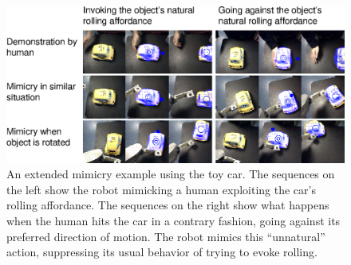 \begin{figure}[tb]
\begin{center}
\includegraphics[width=\textwidth]{fig-mimicry-awkward.eps}
\caption{ 
\label{fig:mimicked-action}
%
An extended mimicry example using the toy car.
The sequences on the left show the robot mimicking a human exploiting
the car's rolling affordance.  The sequences on the right show
what happens when the human hits the car in a contrary fashion, going
against its preferred direction of motion.  The robot mimics this 
``unnatural'' action, suppressing its usual behavior of trying to
evoke rolling.
%
}
\end{center}
\end{figure}


